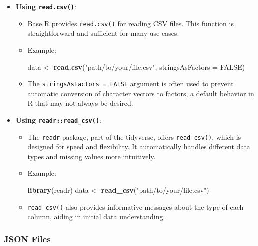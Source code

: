 \documentclass[
]{book}
\newenvironment{Shaded}{\begin{snugshade}}{\end{snugshade}}
\newcommand{\AttributeTok}[1]{\textcolor[rgb]{0.13,0.29,0.53}{#1}}
\newcommand{\ConstantTok}[1]{\textcolor[rgb]{0.56,0.35,0.01}{#1}}
\newcommand{\FunctionTok}[1]{\textcolor[rgb]{0.13,0.29,0.53}{\textbf{#1}}}
\newcommand{\NormalTok}[1]{#1}
\newcommand{\OtherTok}[1]{\textcolor[rgb]{0.56,0.35,0.01}{#1}}
\newcommand{\StringTok}[1]{\textcolor[rgb]{0.31,0.60,0.02}{#1}}
\providecommand{\tightlist}{%
  \setlength{\itemsep}{0pt}\setlength{\parskip}{0pt}}
\begin{document}
\begin{itemize}
\tightlist
\item
  \textbf{Using \texttt{read.csv()}}:

  \begin{itemize}
  \item
    Base R provides \texttt{read.csv()} for reading CSV files. This function is straightforward and sufficient for many use cases.
  \item
    Example:

\begin{Shaded}
\begin{Highlighting}[]
\NormalTok{data }\OtherTok{\textless{}{-}} \FunctionTok{read.csv}\NormalTok{(}\StringTok{"path/to/your/file.csv"}\NormalTok{, }\AttributeTok{stringsAsFactors =} \ConstantTok{FALSE}\NormalTok{)}
\end{Highlighting}
\end{Shaded}
  \item
    The \texttt{stringsAsFactors\ =\ FALSE} argument is often used to prevent automatic conversion of character vectors to factors, a default behavior in R that may not always be desired.
  \end{itemize}
\item
  \textbf{Using \texttt{readr::read\_csv()}}:

  \begin{itemize}
  \item
    The \texttt{readr} package, part of the tidyverse, offers \texttt{read\_csv()}, which is designed for speed and flexibility. It automatically handles different data types and missing values more intuitively.
  \item
    Example:

\begin{Shaded}
\begin{Highlighting}[]
\FunctionTok{library}\NormalTok{(readr)}
\NormalTok{data }\OtherTok{\textless{}{-}} \FunctionTok{read\_csv}\NormalTok{(}\StringTok{"path/to/your/file.csv"}\NormalTok{)}
\end{Highlighting}
\end{Shaded}
  \item
    \texttt{read\_csv()} also provides informative messages about the type of each column, aiding in initial data understanding.
  \end{itemize}
\end{itemize}

\hypertarget{json-files}{%
\subsubsection{JSON Files}\label{json-files}}
\end{document}
